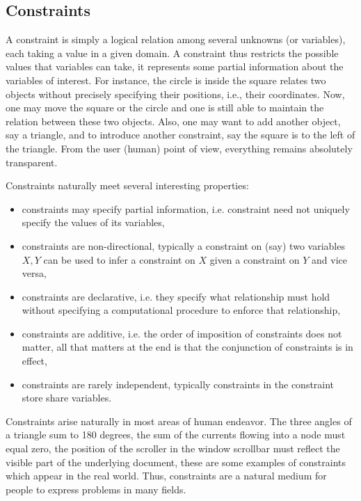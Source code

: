 \subsection{Constraints}\label{introduction:constraints}\hypertarget{introduction:constraints}{}
A constraint is simply a logical relation among several unknowns (or variables), each taking a value in a given domain. A constraint thus restricts the possible values that variables can take, it represents some partial information about the variables of interest. For instance, the circle is inside the square relates two objects without precisely specifying their positions, i.e., their coordinates. Now, one may move the square or the circle and one is still able to maintain the relation between these two objects. Also, one may want to add another object, say a triangle, and to introduce another constraint, say the square is to the left of the triangle. From the user (human) point of view, everything remains absolutely transparent.

Constraints naturally meet several interesting properties:
\begin{itemize}
	\item constraints may specify partial information, i.e. constraint need not uniquely specify the values of its variables,
	\item constraints are non-directional, typically a constraint on (say) two variables $X, Y$ can be used to infer a constraint on $X$ given a constraint on $Y$ and vice versa,
	\item constraints are declarative, i.e. they specify what relationship must hold without specifying a computational procedure to enforce that relationship,
	\item constraints are additive, i.e. the order of imposition of constraints does not matter, all that matters at the end is that the conjunction of constraints is in effect,
	\item constraints are rarely independent, typically constraints in the constraint store share variables.
\end{itemize}

Constraints arise naturally in most areas of human endeavor. The three angles of a triangle sum to 180 degrees, the sum of the currents flowing into a node must equal zero, the position of the scroller in the window scrollbar must reflect the visible part of the underlying document, these are some examples of constraints which appear in the real world. Thus, constraints are a natural medium for people to express problems in many fields. 

